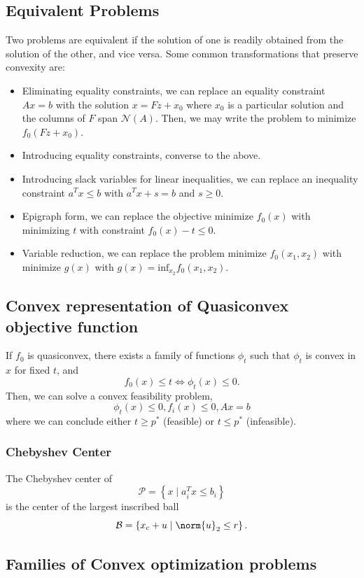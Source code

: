 \documentclass[11pt]{article}
\begin{document}
\subsection{Equivalent Problems} 
Two problems are equivalent if the solution of one is readily obtained from the solution of the other, and vice versa. Some common transformations that preserve convexity are:
\begin{itemize}
    \item Eliminating equality constraints, we can replace an equality constraint $Ax = b$ with the solution $x = Fz + x_0$ where $x_0$ is a particular solution and the columns of $F$ span $\mathcal{N}(A)$. Then, we may write the problem to minimize $f_0(Fz + x_0)$. 
    \item Introducing equality constraints, converse to the above.
    \item Introducing slack variables for linear inequalities, we can replace an inequality constraint $a^Tx \leq b$ with $a^Tx + s = b$ and $s \geq 0$.
    \item Epigraph form, we can replace the objective minimize $f_0(x)$ with minimizing $t$ with constraint $f_0(x) - t \leq 0$. 
    \item Variable reduction, we can replace the problem minimize $f_0(x_1, x_2)$ with minimize $g(x)$ with $g(x) = \mathrm{inf}_{x_2} f_0(x_1, x_2)$.
\end{itemize}

\subsection{Convex representation of Quasiconvex objective function} 
If $f_0$ is quasiconvex, there exists a family of functions $\phi_t$ such that $\phi_t$ is convex in $x$ for fixed $t$, and 
\[ f_0(x) \leq t \Leftrightarrow \phi_t(x) \leq 0. \] 
Then, we can solve a convex feasibility problem,
\[ \phi_t(x) \leq 0, f_i(x) \leq 0, Ax=b \] 
where we can conclude either $t \geq p^*$ (feasible) or $t \leq p^*$ (infeasible). 

\subsubsection*{Chebyshev Center}
The Chebyshev center of 
\[ \mathcal{P} = \left\{ x \mid a_i^Tx \leq b_i \right\} \] 
is the center of the largest inscribed ball 
\[ \mathcal{B} = \left\{ x_c + u \mid \norm{u}_2 \leq r \right\}. \] 


\subsection{Families of Convex optimization problems}
\end{document}
